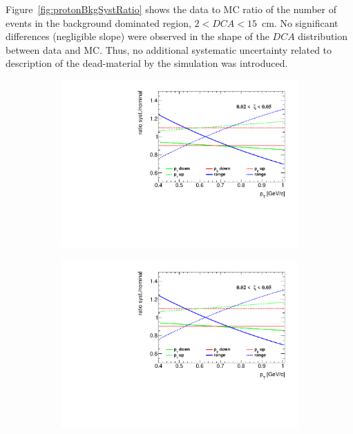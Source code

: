  Figure~\ref{fig:protonBkgSystRatio} shows the data to MC ratio of  the  number of events in the background dominated region, $2<DCA<15$~cm. No significant differences (negligible slope) were observed in the shape of the $DCA$ distribution between data and MC. Thus, no additional systematic uncertainty related to description of the dead-material by the simulation was introduced.
 \captionsetup{format=plain,indention=0pt,justification=justified}
 \begin{figure}[h!]
 	\centering
 	\begin{subfigure}{.49\textwidth}
 		\includegraphics[width=\textwidth,page=1]{chapters/chrgSTAR/img/DCAproton/p_bkg.pdf}
 	\end{subfigure}
 	\begin{subfigure}{.49\textwidth}
 		\includegraphics[width=\textwidth,page=2]{chapters/chrgSTAR/img/DCAproton/p_bkg.pdf}

\end{subfigure}
\end{figure}
